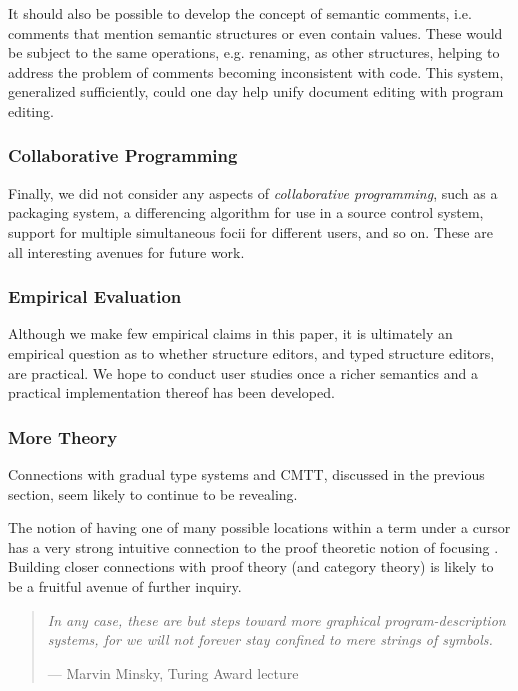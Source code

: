 \documentclass[9pt]{sigplanconf}
\begin{document}
It should also be possible to develop the concept of semantic comments,
i.e. comments that mention semantic structures or even contain values. These would be subject to
the same operations, e.g. renaming, as other structures, helping to address
the problem of comments becoming inconsistent with code. This system, generalized sufficiently,
could one day help unify document editing with program editing.

\subsubsection{Collaborative Programming}
Finally, we did not consider any aspects of \emph{collaborative
programming}, such as a packaging system, a differencing algorithm for use
in a source control system, support for multiple simultaneous focii for
different users, and so on. These are all interesting avenues for future
work.

\subsubsection{Empirical Evaluation}
Although we make few empirical claims in this paper, it is ultimately an
empirical question as to whether structure editors, and typed structure
editors, are practical. We hope to conduct user studies once a richer
semantics and a practical implementation thereof has been developed.

\subsubsection{More Theory}
Connections with gradual type systems and CMTT, discussed in the previous
section, seem likely to continue to be revealing.

The notion of having one of many possible locations within a term under a
cursor has a very strong intuitive connection to the proof theoretic notion
of focusing \cite{Simmons11tr}. Building closer connections with proof
theory (and category theory) is likely to be a fruitful avenue of further
inquiry.

\begin{quote}
\emph{In any case, these are but steps toward more graphical program-description
systems, for we will not forever stay confined to mere strings of symbols.}

--- Marvin Minsky, Turing Award lecture \cite{DBLP:journals/jacm/Minsky70}
\end{quote}

\acks


\clearpage
\balance



% 
\end{document}

